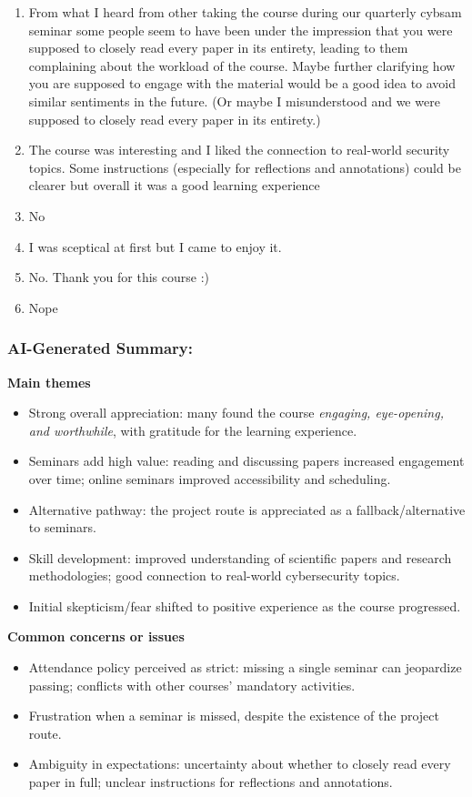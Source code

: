 \documentclass[a4paper]{report}
\begin{document}
\begin{enumerate}
  \item From what I heard from other taking the course during our quarterly cybsam seminar some people seem to have been under the impression that you were supposed to closely read every paper in its entirety, leading to them complaining about the workload of the course. Maybe further clarifying how you are supposed to engage with the material would be a good idea to avoid similar sentiments in the future. (Or maybe I misunderstood and we were supposed to closely read every paper in its entirety.)
  \item The course was interesting and I liked the connection to real-world security topics. Some instructions (especially for reflections and annotations) could be clearer but overall it was a good learning experience
  \item No
  \item I was sceptical at first but I came to enjoy it.
  \item No. Thank you for this course :)
  \item Nope
\end{enumerate}

\subsubsection{AI-Generated Summary:}

\textbf{Main themes}
\begin{itemize}
\item Strong overall appreciation: many found the course \textit{engaging, eye-opening, and worthwhile}, with gratitude for the learning experience.
\item Seminars add high value: reading and discussing papers increased engagement over time; online seminars improved accessibility and scheduling.
\item Alternative pathway: the project route is appreciated as a fallback/alternative to seminars.
\item Skill development: improved understanding of scientific papers and research methodologies; good connection to real-world cybersecurity topics.
\item Initial skepticism/fear shifted to positive experience as the course progressed.
\end{itemize}

\textbf{Common concerns or issues}
\begin{itemize}
\item Attendance policy perceived as strict: missing a single seminar can jeopardize passing; conflicts with other courses’ mandatory activities.
\item Frustration when a seminar is missed, despite the existence of the project route.
\item Ambiguity in expectations: uncertainty about whether to closely read every paper in full; unclear instructions for reflections and annotations.
\end{itemize}
\end{document}
